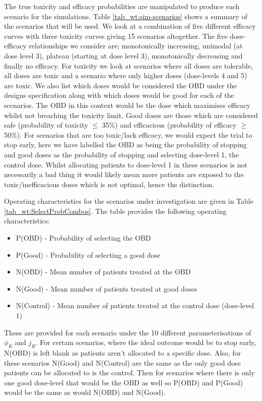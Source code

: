 The true toxicity and efficacy probabilities are manipulated to produce each scenario for the simulations. Table \ref{tab_wt:sim-scenarios} shows a summary of the scenarios that will be used. We look at a combination of five different efficacy curves with three toxicity curves giving 15 scenarios altogether. The five dose-efficacy relationships we consider are; monotonically increasing, unimodal (at dose level 3), plateau (starting at dose level 3), monotonically decreasing and finally no efficacy. For toxicity we look at scenarios where all doses are tolerable, all doses are toxic and a scenario where only higher doses (dose-levels 4 and 5) are toxic. We also list which doses would be considered the OBD under the designs specification along with which doses would be good for each of the scenarios. The OBD in this context would be the dose which maximises efficacy whilst not breaching the toxicity limit. Good doses are those which are considered safe (probability of toxicity $\leq$ 35\%) and efficacious (probability of efficacy $\geq$ 50\%). For scenarios that are too toxic/lack efficacy, we would expect the trial to stop early, here we have labelled the OBD as being the probability of stopping and good doses as the probability of stopping and selecting dose-level 1, the control dose. Whilst allocating patients to dose-level 1 in these scenarios is not necessarily a bad thing it would likely mean more patients are exposed to the toxic/inefficacious doses which is not optimal, hence the distinction.  

Operating characteristics for the scenarios under investigation are given in Table \ref{tab_wt:SelectProbCombos}. The table provides the following operating characteristics: 

\begin{itemize}
	\item P(OBD) - Probability of selecting the OBD
	\item P(Good) - Probability of selecting a good dose
	\item N(OBD) - Mean number of patients treated at the OBD
	\item N(Good) - Mean number of patients treated at good doses
	\item N(Control) - Mean number of patients treated at the control dose (dose-level 1)
\end{itemize}

These are provided for each scenario under the 10 different parameterisations of $\phi_R$ and $j_R$. For certain scenarios, where the ideal outcome would be to stop early, N(OBD) is left blank as patients aren't allocated to a specific dose. Also, for these scenarios N(Good) and N(Control) are the same as the only good dose patients can be allocated to is the control. Then for scenarios where there is only one good dose-level that would be the OBD as well so P(OBD) and P(Good) would be the same as would N(OBD) and N(Good). 

